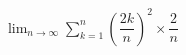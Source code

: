 \hspace*{2mm}\begin{minipage}[t]{\dimexpr\linewidth-2mm\relax}\vspace{0pt}
$\displaystyle\lim_{n\to\infty}\sum_{k=1}^{n}\left(\dfrac{2k}{n}\right)^{2}\times\dfrac{2}{n}$\end{minipage}
